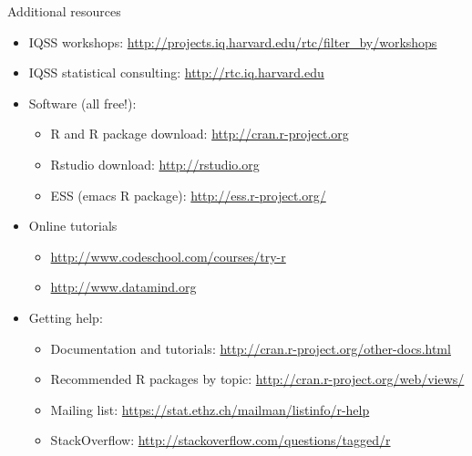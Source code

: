 \documentclass[table,smaller]{beamer}
\begin{document}
\begin{frame}[label=sec-8-2]{Additional resources}
\begin{itemize}
\item IQSS workshops: \url{http://projects.iq.harvard.edu/rtc/filter_by/workshops}

\item IQSS statistical consulting: \url{http://rtc.iq.harvard.edu}

\item Software (all free!):
\begin{itemize}
\item R and R package download: \url{http://cran.r-project.org}
\item Rstudio download: \url{http://rstudio.org}
\item ESS (emacs R package): \url{http://ess.r-project.org/}
\end{itemize}

\item Online tutorials
\begin{itemize}
\item \url{http://www.codeschool.com/courses/try-r}
\item \url{http://www.datamind.org}
\end{itemize}

\item Getting help:
\begin{itemize}
\item Documentation and tutorials: \url{http://cran.r-project.org/other-docs.html}
\item Recommended R packages by topic: \url{http://cran.r-project.org/web/views/}
\item Mailing list: \url{https://stat.ethz.ch/mailman/listinfo/r-help}
\item StackOverflow: \url{http://stackoverflow.com/questions/tagged/r}
\end{itemize}
\end{itemize}
\end{frame}
\end{document}
